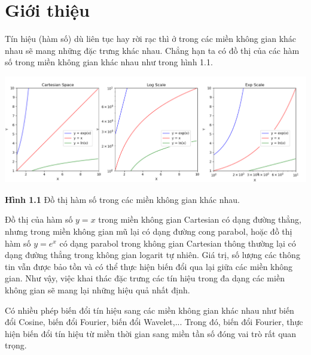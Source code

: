 \section{Giới thiệu}
\par Tín hiệu (hàm số) dù liên tục hay rời rạc thì ở trong các miền không gian khác nhau sẽ mang những đặc trưng khác nhau. Chẳng hạn ta có đồ thị của các hàm số trong miền không gian khác nhau như trong hình 1.1.

\begin{center}
    \includegraphics[scale=0.4]{Figures/diff_space.png}
    \par \textbf {Hình 1.1} Đồ thị hàm số trong các miền không gian khác nhau.
\end{center}
Đồ thị của hàm số $y=x$ trong miền không gian Cartesian có dạng đường thẳng, nhưng trong miền không gian mũ lại có dạng đường cong parabol, hoặc đồ thị hàm số $y=e^x$ có dạng parabol trong không gian Cartesian thông thường lại có dạng đường thẳng trong không gian logarit tự nhiên. Giá trị, số lượng các thông tin vẫn được bảo tồn và có thể thực hiện biến đổi qua lại giữa các miền không gian. Như vậy, việc khai thác đặc trưng các tín hiệu trong đa dạng các miền không gian sẽ mang lại những hiệu quả nhất định.
\par Có nhiều phép biến đổi tín hiệu sang các miền không gian khác nhau như biến đổi Cosine, biến đổi Fourier, biến đổi Wavelet,... Trong đó, biến đổi Fourier, thực hiện biến đổi tín hiệu từ miền thời gian sang miền tần số đóng vai trò rất quan trọng.
